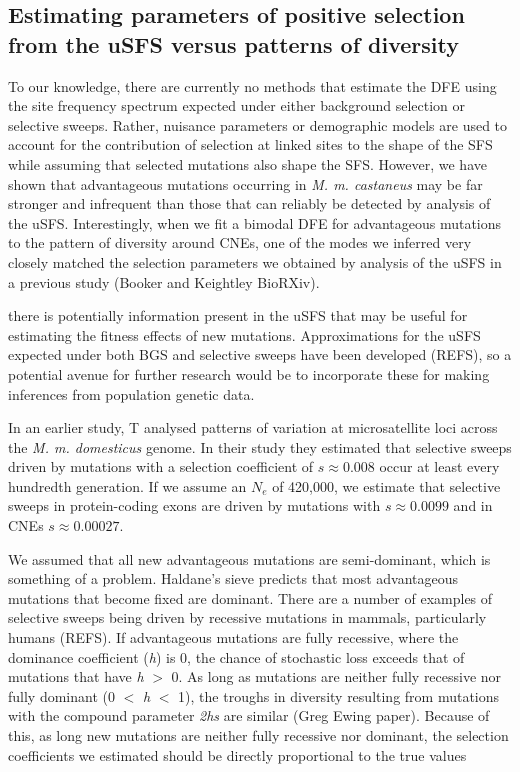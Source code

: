 \subsection*{Estimating parameters of positive selection from the uSFS versus patterns of diversity}

To our knowledge, there are currently no methods that estimate the DFE using the site frequency spectrum expected under either background selection or selective sweeps. Rather, nuisance parameters or demographic models are used to account for the contribution of selection at linked sites to the shape of the SFS while assuming that selected mutations also shape the SFS. 
However, we have shown that advantageous mutations occurring in \textit{M. m. castaneus} may be far stronger and infrequent than those that can reliably be detected by analysis of the uSFS. Interestingly, when we fit a bimodal DFE for advantageous mutations to the pattern of diversity around CNEs, one of the modes we inferred very closely matched the selection parameters we obtained by analysis of the uSFS in a previous study (Booker and Keightley BioRXiv).

there is potentially information present in the uSFS that may be useful for estimating the fitness effects of new mutations. Approximations for the uSFS expected under both BGS and selective sweeps have been developed (REFS), so a potential avenue for further research would be to incorporate these for making inferences from population genetic data.

In an earlier study, T\cite{RN355} analysed patterns of variation at microsatellite loci across the \textit{M. m. domesticus} genome. In their study they estimated that selective sweeps driven by mutations with a selection coefficient of $s \approx 0.008$ occur at least every hundredth generation. If we assume an $N_e$ of 420,000, we estimate that selective sweeps in protein-coding exons are driven by mutations with $s \approx 0.0099$ and in CNEs $s \approx 0.00027$.

We assumed that all new advantageous mutations are semi-dominant, which is something of a problem. Haldane's sieve predicts that most advantageous mutations that become fixed are dominant. There are a number of examples of selective sweeps being driven by recessive mutations in mammals, particularly humans (REFS). If advantageous mutations are fully recessive, where the dominance coefficient (\textit{h}) is 0, the chance of stochastic loss exceeds that of mutations that have \textit{h} $>$ 0. As long as mutations are neither fully recessive nor fully dominant (0 $<$ \textit{h} $<$ 1), the troughs in diversity resulting from mutations with the compound parameter \textit{2hs} are similar (Greg Ewing paper). Because of this, as long new mutations are neither fully recessive nor dominant, the selection coefficients we estimated should be directly proportional to the true values

